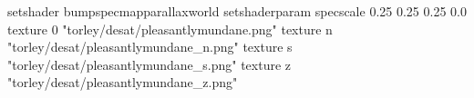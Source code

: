 setshader bumpspecmapparallaxworld
setshaderparam specscale 0.25 0.25 0.25 0.0
texture 0 "torley/desat/pleasantlymundane.png"
texture n "torley/desat/pleasantlymundane_n.png"
texture s "torley/desat/pleasantlymundane_s.png"
texture z "torley/desat/pleasantlymundane_z.png"

